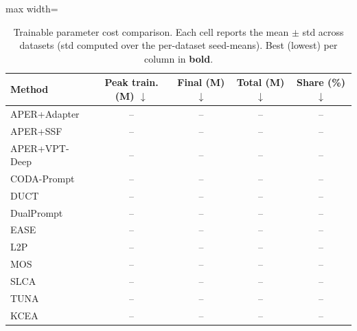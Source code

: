 \begin{table}[!t]
\centering
\caption{Trainable parameter cost comparison. Each cell reports the mean $\pm$ std across datasets (std computed over the per-dataset seed-means). Best (lowest) per column in \textbf{bold}.}
\label{tab:cost-params}
\renewcommand{\arraystretch}{0.95}
\begin{adjustbox}{max width=\textwidth}
\footnotesize
\begin{tabular}{l c c c c}
\toprule
Method & \textbf{Peak train. (M)} $\downarrow$ & \textbf{Final (M)} $\downarrow$ & \textbf{Total (M)} $\downarrow$ & \textbf{Share (\%)} $\downarrow$ \\
\midrule
APER+Adapter & -- & -- & -- & -- \\
APER+SSF & -- & -- & -- & -- \\
APER+VPT-Deep & -- & -- & -- & -- \\
CODA-Prompt & -- & -- & -- & -- \\
DUCT & -- & -- & -- & -- \\
DualPrompt & -- & -- & -- & -- \\
EASE & -- & -- & -- & -- \\
L2P & -- & -- & -- & -- \\
MOS & -- & -- & -- & -- \\
SLCA & -- & -- & -- & -- \\
TUNA & -- & -- & -- & -- \\
\midrule
KCEA & -- & -- & -- & -- \\
\bottomrule
\end{tabular}
\end{adjustbox}
\end{table}